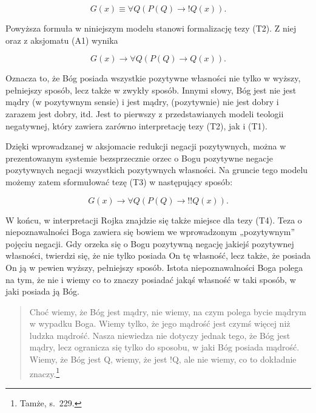 \begin{equation}\label{G5}\tag{G5}
 G(x) \equiv  \forall Q (P(Q) \to  !Q(x)).
\end{equation}



Powyższa formuła w niniejszym modelu stanowi formalizację tezy (T2). Z
niej oraz z aksjomatu (A1) wynika




\begin{equation}
G(x) \to  \forall Q (P(Q) \to  Q(x)).
\end{equation}




Oznacza to, że Bóg posiada wszystkie pozytywne własności nie tylko w
wyższy, pełniejszy sposób, lecz także w zwykły sposób. Innymi słowy,
Bóg jest nie jest mądry (w pozytywnym sensie) i jest mądry,
(pozytywnie) nie jest dobry i zarazem jest dobry, itd. Jest to pierwszy
z przedstawianych modeli teologii negatywnej, który zawiera zarówno
interpretację tezy (T2), jak i (T1).

Dzięki wprowadzanej w aksjomacie redukcji negacji pozytywnych, można w
prezentowanym systemie bezsprzecznie orzec o Bogu pozytywne negacje
pozytywnych negacji wszystkich pozytywnych własności. Na gruncie tego
modelu możemy zatem sformułować tezę (T3) w następujący sposób:




\begin{equation}
G(x) \to  \forall Q (P(Q) \to  !!Q(x)).
\end{equation}




W końcu, w interpretacji Rojka znajdzie się także miejsce dla tezy (T4).
Teza o niepoznawalności Boga zawiera się bowiem we wprowadzonym
„pozytywnym” pojęciu negacji. Gdy orzeka się o Bogu pozytywną negację
jakiejś pozytywnej własności, twierdzi się, że nie tylko posiada On tę
własność, lecz także, że posiada On ją w pewien wyższy, pełniejszy
sposób. Istota niepoznawalności Boga polega na tym, że nie i wiemy co
to znaczy posiadać jakąś własność w taki sposób, w jaki posiada ją Bóg.



\begin{quote}
    Choć wiemy, że Bóg jest mądry, nie wiemy, na czym polega bycie mądrym w
wypadku Boga. Wiemy tylko, że jego mądrość jest czymś więcej niż ludzka
mądrość. Nasza niewiedza nie dotyczy jednak tego, że Bóg jest mądry,
lecz ogranicza się tylko do sposobu, w jaki Bóg posiada mądrość. Wiemy,
że Bóg jest Q, wiemy, że jest !Q, ale nie wiemy, co to dokładnie
znaczy.\footnote{Tamże, s.~229. }
\end{quote}






